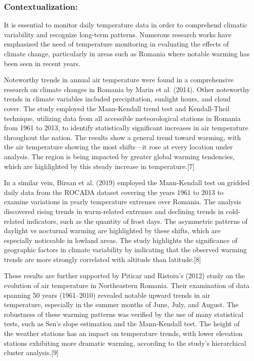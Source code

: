 \documentclass{article} %
\begin{document}
\subsubsection*{Contextualization:}
It is essential to monitor daily temperature data in order to comprehend climatic variability and recognize long-term patterns. Numerous research works have emphasized the need of temperature monitoring in evaluating the effects of climate change, particularly in areas such as Romania where notable warming has been seen in recent years.

Noteworthy trends in annual air temperature were found in a comprehensive research on climate changes in Romania by Marin et al. (2014). Other noteworthy trends in climate variables included precipitation, sunlight hours, and cloud cover. The study employed the Mann-Kendall trend test and Kendall-Theil technique, utilizing data from all accessible meteorological stations in Romania from 1961 to 2013, to identify statistically significant increases in air temperature throughout the nation. The results show a general trend toward warming, with the air temperature showing the most shifts—it rose at every location under analysis. The region is being impacted by greater global warming tendencies, which are highlighted by this steady increase in temperature.[7]

In a similar vein, Birsan et al. (2019) employed the Mann-Kendall test on gridded daily data from the ROCADA dataset covering the years 1961 to 2013 to examine variations in yearly temperature extremes over Romania. The analysis discovered rising trends in warm-related extremes and declining trends in cold-related indicators, such as the quantity of frost days. The asymmetric patterns of daylight vs nocturnal warming are highlighted by these shifts, which are especially noticeable in lowland areas. The study highlights the significance of geographic factors in climate variability by indicating that the observed warming trends are more strongly correlated with altitude than latitude.[8]

These results are further supported by Piticar and Ristoiu's (2012) study on the evolution of air temperature in Northeastern Romania. Their examination of data spanning 50 years (1961–2010) revealed notable upward trends in air temperature, especially in the summer months of June, July, and August. The robustness of these warming patterns was verified by the use of many statistical tests, such as Sen's slope estimation and the Mann-Kendall test. The height of the weather stations has an impact on temperature trends, with lower elevation stations exhibiting more dramatic warming, according to the study's hierarchical cluster analysis.[9]
\end{document}
